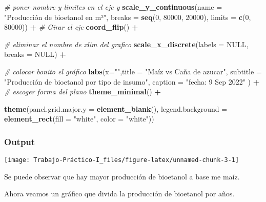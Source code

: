 \documentclass[
]{article}
\newenvironment{Shaded}{\begin{snugshade}}{\end{snugshade}}
\newcommand{\AttributeTok}[1]{\textcolor[rgb]{0.13,0.29,0.53}{#1}}
\newcommand{\CommentTok}[1]{\textcolor[rgb]{0.56,0.35,0.01}{\textit{#1}}}
\newcommand{\ConstantTok}[1]{\textcolor[rgb]{0.56,0.35,0.01}{#1}}
\newcommand{\DecValTok}[1]{\textcolor[rgb]{0.00,0.00,0.81}{#1}}
\newcommand{\FunctionTok}[1]{\textcolor[rgb]{0.13,0.29,0.53}{\textbf{#1}}}
\newcommand{\NormalTok}[1]{#1}
\newcommand{\SpecialCharTok}[1]{\textcolor[rgb]{0.81,0.36,0.00}{\textbf{#1}}}
\newcommand{\StringTok}[1]{\textcolor[rgb]{0.31,0.60,0.02}{#1}}
\begin{document}
\begin{Shaded}
\begin{Highlighting}[]
   \CommentTok{\# poner nombre y limites en el eje y}
  \FunctionTok{scale\_y\_continuous}\NormalTok{(}\AttributeTok{name =} \StringTok{"Producción de bioetanol en m³"}\NormalTok{,}
                     \AttributeTok{breaks =} \FunctionTok{seq}\NormalTok{(}\DecValTok{0}\NormalTok{, }\DecValTok{80000}\NormalTok{, }\DecValTok{20000}\NormalTok{), }
                     \AttributeTok{limits =} \FunctionTok{c}\NormalTok{(}\DecValTok{0}\NormalTok{, }\DecValTok{80000}\NormalTok{)) }\SpecialCharTok{+}
   \CommentTok{\# Girar  el eje }
  \FunctionTok{coord\_flip}\NormalTok{() }\SpecialCharTok{+}
   
   \CommentTok{\# eliminar el nombre de  xlim del grafico }
   \FunctionTok{scale\_x\_discrete}\NormalTok{(}\AttributeTok{labels =} \ConstantTok{NULL}\NormalTok{, }\AttributeTok{breaks =} \ConstantTok{NULL}\NormalTok{) }\SpecialCharTok{+} 
   
   \CommentTok{\# colocar bonito el gráfico }
  \FunctionTok{labs}\NormalTok{(}\AttributeTok{x=}\StringTok{""}\NormalTok{,}\AttributeTok{title =} \StringTok{"Maíz vs Caña de azucar"}\NormalTok{, }
       \AttributeTok{subtitle =} \StringTok{"Producción de bioetanol por tipo de insumo"}\NormalTok{, }
       \AttributeTok{caption =} \StringTok{"fecha: 9 Sep 2022"}\NormalTok{ ) }\SpecialCharTok{+}
   \CommentTok{\# escoger forma del plano }
  \FunctionTok{theme\_minimal}\NormalTok{() }\SpecialCharTok{+}
   
  \FunctionTok{theme}\NormalTok{(}\AttributeTok{panel.grid.major.y =} \FunctionTok{element\_blank}\NormalTok{(),}
        \AttributeTok{legend.background =} \FunctionTok{element\_rect}\NormalTok{(}\AttributeTok{fill =} \StringTok{"white"}\NormalTok{, }\AttributeTok{color =} \StringTok{"white"}\NormalTok{))}
\end{Highlighting}
\end{Shaded}

\subsubsection{Output}\label{output}

\begin{center}\texttt{[image: Trabajo-Práctico-I\_files/figure-latex/unnamed-chunk-3-1]} \end{center}

Se puede observar que hay mayor producción de bioetanol a base me maíz.

Ahora veamos un gráfico que divida la producción de bioetanol por años.
\end{document}
